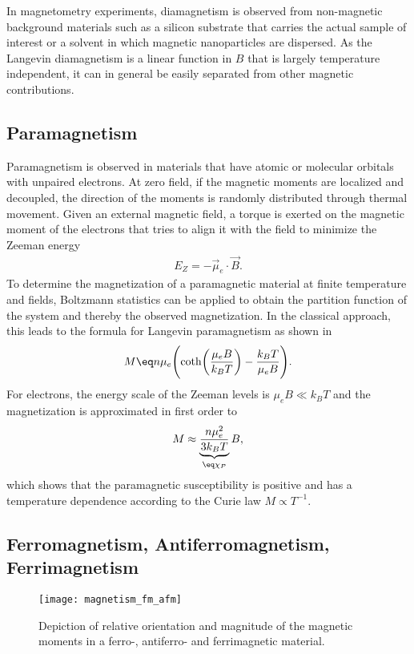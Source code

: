 \documentclass[\main/dresen_thesis.tex]{subfiles}
\begin{document}
      In magnetometry experiments, diamagnetism is observed from non-magnetic background materials such as a silicon substrate that carries the actual sample of interest or a solvent in which magnetic nanoparticles are dispersed.
      As the Langevin diamagnetism is a linear function in $B$ that is largely temperature independent, it can in general be easily separated from other magnetic contributions.

    \subsection{Paramagnetism}\label{ch:theoreticalBackground:magnetism:paramagnetism}
      Paramagnetism is observed in materials that have atomic or molecular orbitals with unpaired electrons.
      At zero field, if the magnetic moments are localized and decoupled, the direction of the moments is randomly distributed through thermal movement.
      Given an external magnetic field, a torque is exerted on the magnetic moment of the electrons that tries to align it with the field to minimize the Zeeman energy
      \begin{align}
        E_Z = - \vec{\mu}_e \cdot \vec{B}.
      \end{align}
      To determine the magnetization of a paramagnetic material at finite temperature and fields, Boltzmann statistics can be applied to obtain the partition function of the system and thereby the observed magnetization.
      In the classical approach, this leads to the formula for Langevin paramagnetism as shown in 
      \begin{align}
        M \eq n \mu_e \Biggl( \coth \biggl(\frac{\mu_e B}{k_B T} \biggr) - \frac{k_B T}{\mu_e B} \Biggr).
      \end{align}
      For electrons, the energy scale of the Zeeman levels is $\mu_e B \ll k_B T$ and the magnetization is approximated in first order to
      \begin{align}
        M \approx \underbrace{\frac{n \mu_e^2}{3k_B T}}_{\eq \chi_P} B,
      \end{align}
      which shows that the paramagnetic susceptibility is positive and has a temperature dependence according to the Curie law $M \propto T^{-1}$.

    \subsection{Ferromagnetism, Antiferromagnetism, Ferrimagnetism}
      \begin{figure}[tb]
        \centering
        \texttt{[image: magnetism\_fm\_afm]}
        \caption{\label{fig:theoreticalBackground:magnetism:fm_afm_fim}Depiction of relative orientation and magnitude of the magnetic moments in a ferro-, antiferro- and ferrimagnetic material.}
      \end{figure}
\end{document}
